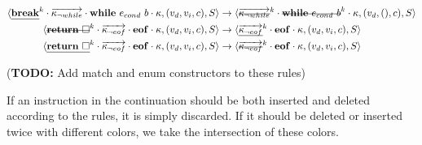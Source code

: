 \documentclass[a4paper,11pt]{article}
\newcommand\mathst[1]{\text{\st{$#1$}}}
\newcommand\mathul[1]{\text{\ul{$#1$}}}
\newcommand\todo[1]{{\color{teal}(\textbf{TODO:} #1)}}
\begin{document}
\begin{align*}
\langle \mathul{\mathbf{break}}^k \cdot \overrightarrow{\kappa_{\neg while}} \cdot \mathbf{while}\ e_{cond}\ b \cdot \kappa, (v_d, v_i, c), S\rangle &\rightarrow \langle \overrightarrow{\mathst{\kappa_{\neg while}}}^k \cdot \mathst{\mathbf{while}\ e_{cond}\ b}^k \cdot \kappa, (v_d, (), c), S\rangle\\
\langle \mathst{\mathbf{return}\ \square}^k \cdot \overrightarrow{\kappa_{\neg eof}} \cdot \mathbf{eof} \cdot \kappa, (v_d, v_i, c), S\rangle &\rightarrow \langle \overrightarrow{\mathul{\kappa_{\neg eof}}}^k \cdot \mathbf{eof} \cdot \kappa, (v_d, v_i, c), S\rangle\\
\langle \mathul{\mathbf{return}\ \square}^k \cdot \overrightarrow{\kappa_{\neg eof}} \cdot \mathbf{eof} \cdot \kappa, (v_d, v_i, c), S\rangle &\rightarrow \langle \overrightarrow{\mathst{\kappa_{\neg eof}}}^k \cdot \mathbf{eof} \cdot \kappa, (v_d, v_i, c), S\rangle\\
\end{align*}

\todo{Add match and enum constructors to these rules}

If an instruction in the continuation should be both inserted and deleted according to the rules, it is simply discarded. If it should be deleted or inserted twice with different colors, we take the intersection of these colors.
\end{document}
